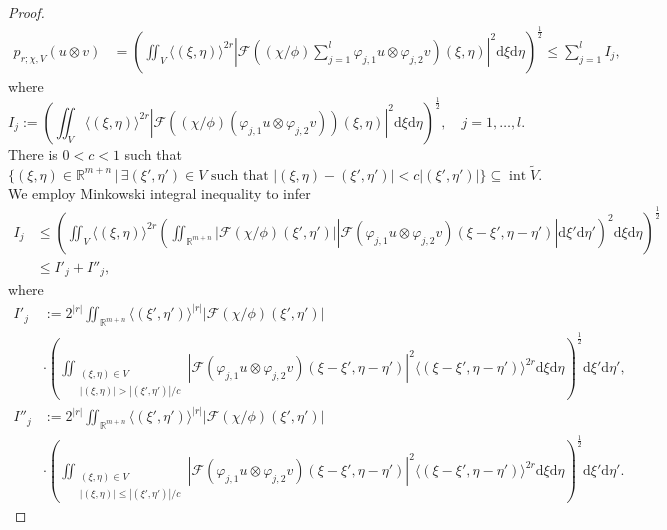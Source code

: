 \documentclass{amsart}
\theoremstyle{definition}
\begin{document}
\begin{proof}
\begin{align*}
p_{r; \chi , V} (u\otimes v)&=\left(\iint_V \langle(\xi,\eta)\rangle^{2r}\left|\mathcal{F}\left((\chi/\phi)\sum_{j=1}^l\varphi_{j,1}u\otimes \varphi_{j,2}v\right)(\xi,\eta)\right|^2\mathrm{d}\xi \mathrm{d}\eta\right)^{\frac{1}{2}}\leq \sum_{j=1}^l I_j,
\end{align*}
where
\begin{equation*}
I_j:=\left(\iint_V \langle(\xi,\eta)\rangle^{2r}\left|\mathcal{F}\left((\chi/\phi)(\varphi_{j,1}u\otimes\varphi_{j,2}v)\right)(\xi,\eta)\right|^2\mathrm{d}\xi \mathrm{d}\eta\right)^{\frac{1}{2}},\quad j=1,\ldots, l.
\end{equation*}
There is $0<c<1$ such that
\begin{equation}\label{sub-for-cha-offc}
\{(\xi,\eta)\in\mathbb{R}^{m+n}\,|\, \exists(\xi',\eta')\in V\,\, \mbox{such that}\,\,|(\xi,\eta)-(\xi',\eta')|< c|(\xi',\eta')|\}\subseteq\operatorname{int} \widetilde{V}.
\end{equation}
We employ Minkowski integral inequality to infer
\begin{align*}
I_j&\leq \left(\iint_V \langle(\xi,\eta)\rangle^{2r}\left(\iint_{\mathbb{R}^{m+n}}|\mathcal{F}(\chi/\phi)(\xi',\eta')||\mathcal{F}(\varphi_{j,1}u\otimes\varphi_{j,2}v)(\xi-\xi',\eta-\eta')|\mathrm{d}\xi' \mathrm{d}\eta'\right)^2\mathrm{d}\xi \mathrm{d}\eta\right)^{\frac{1}{2}}\\
&\leq I'_j+I''_j,
\end{align*}
where
\begin{align*}
I'_j&:=2^{|r|}\iint_{\mathbb{R}^{m+n}} \langle(\xi',\eta')\rangle^{|r|}|\mathcal{F}(\chi/\phi)(\xi',\eta')|\\
&\cdot\left(\iint_{\substack{(\xi,\eta)\in V\\ |(\xi,\eta)|> |(\xi',\eta')|/c}}|\mathcal{F}(\varphi_{j,1}u\otimes\varphi_{j,2}v)(\xi-\xi',\eta-\eta')|^2\langle(\xi-\xi',\eta-\eta')\rangle^{2r}\mathrm{d}\xi \mathrm{d}\eta\right)^{\frac{1}{2}}\mathrm{d}\xi' \mathrm{d}\eta',\\
I''_j&:=2^{|r|}\iint_{\mathbb{R}^{m+n}} \langle(\xi',\eta')\rangle^{|r|}|\mathcal{F}(\chi/\phi)(\xi',\eta')|\\
&\cdot\left(\iint_{\substack{(\xi,\eta)\in V\\ |(\xi,\eta)|\leq |(\xi',\eta')|/c}}|\mathcal{F}(\varphi_{j,1}u\otimes\varphi_{j,2}v)(\xi-\xi',\eta-\eta')|^2\langle(\xi-\xi',\eta-\eta')\rangle^{2r}\mathrm{d}\xi \mathrm{d}\eta\right)^{\frac{1}{2}}\mathrm{d}\xi' \mathrm{d}\eta'.
\end{align*}

\end{proof}
\end{document}
